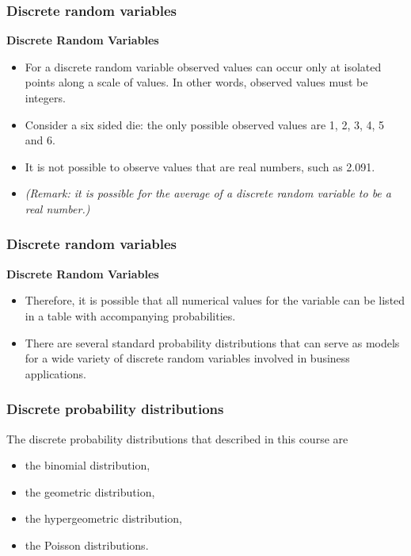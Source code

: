 \documentclass{beamer}
\begin{document}
\begin{frame}
\frametitle{Discrete random variables}
\Large
\vspace{-0.7cm}
\textbf{Discrete Random Variables}
\begin{itemize}
\item For a discrete random variable observed values can occur only at isolated points along a scale of values. In other words, observed values must be integers.
\item Consider a six sided die: the only possible observed values are 1, 2, 3, 4, 5 and 6. 
\item It is not possible to observe values that are real numbers, such as 2.091.
\large
\item \textit{(Remark: it is possible for the average of a discrete random variable to be a real number.)}
\end{itemize}
\end{frame}
\begin{frame}
\frametitle{Discrete random variables}
\Large
\vspace{-1cm}
\textbf{Discrete Random Variables}
\begin{itemize}
\item Therefore, it is possible that all numerical values for the variable can be listed in a table with accompanying
probabilities. 
\item
There are several standard probability distributions that can serve as models for a wide variety of discrete random variables involved in business applications. 
\end{itemize}
\end{frame}
\begin{frame}
\frametitle{Discrete probability distributions}
\Large
\vspace{-1cm}
The discrete probability distributions that described in this course are
\begin{itemize}
\item the binomial distribution, 
\item the geometric distribution,
\item the hypergeometric distribution, 
\item the Poisson distributions.
\end{itemize}
\end{frame}

\end{document}
